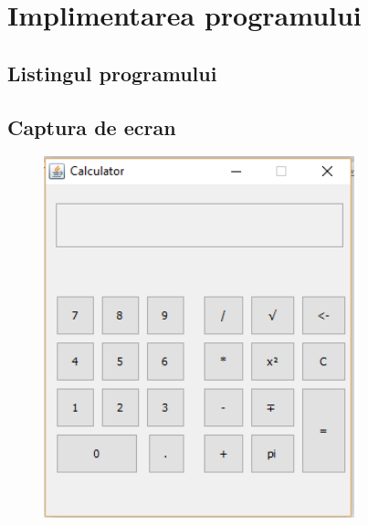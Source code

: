 \section{Implimentarea programului}

\subsection{Listingul programului}



\subsection{Captura de ecran}

\begin{figure}[ht!]
	\centering
	\includegraphics[width=90mm]{Screenshot.png}
\end{figure}
